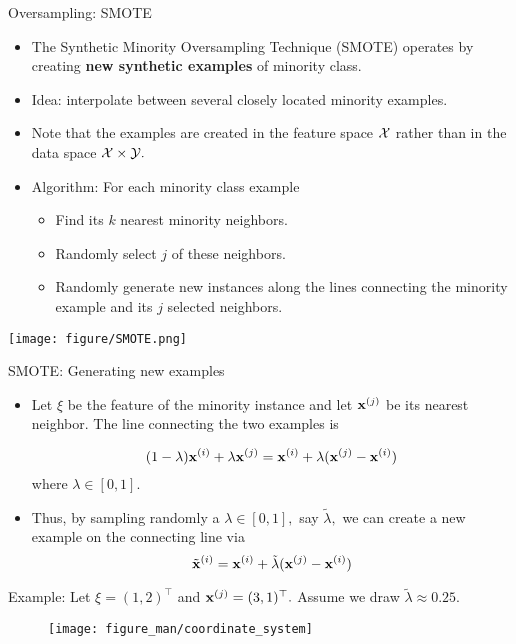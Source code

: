 \documentclass[11pt,compress,t,notes=noshow, xcolor=table]{beamer}
\begin{document}
	
	\begin{frame}{Oversampling: SMOTE}
		\footnotesize
		\begin{itemize}
			\item The Synthetic Minority Oversampling Technique (SMOTE) operates by creating \textbf{new synthetic examples} of minority class.

			\item Idea: interpolate between several closely located minority examples.

			\item Note that the examples are created in the feature space $\mathcal{X}$ rather than in the data space $\mathcal{X}\times\mathcal{Y}.$
	
			\item Algorithm: For each minority class example 

			\begin{itemize} 
                \footnotesize

				\item Find its $k$ nearest minority neighbors.
		
				\item Randomly select $j$ of these neighbors.
		
				\item Randomly generate new instances along the lines connecting the minority example and its $j$ selected neighbors.
		
			\end{itemize}

		\end{itemize}
%	
		\texttt{[image: figure/SMOTE.png]} 
	\end{frame}
	
	\begin{frame}{SMOTE: Generating new examples}
		\footnotesize
		
			\begin{itemize}
	
				\item Let $\xi$ be the feature of the minority instance and let $\mathbf{x}^{(j)}$ be its nearest neighbor. The line connecting the two examples is
				
				$$		(1-\lambda) \mathbf{x}^{(i)} + \lambda\mathbf{x}^{(j)} = \mathbf{x}^{(i)} + \lambda(\mathbf{x}^{(j)} - \mathbf{x}^{(i)})	$$
%				
				where $\lambda \in [0,1].$
				\item Thus, by sampling randomly a $\lambda \in [0,1],$ say $\tilde{\lambda},$ we can create a new example on the connecting line via
%				
				$$   \tilde{\mathbf{x}}^{(i)} =  \mathbf{x}^{(i)} + \tilde{\lambda}(\mathbf{x}^{(j)} - \mathbf{x}^{(i)})	 $$
			\end{itemize}		
				
				Example: Let $\xi = (1,2)^\top$ and $\mathbf{x}^{(j)} = (3,1)^\top.$ Assume we draw $\tilde{\lambda} \approx 0.25.$
			\begin{figure}
				\centering
				\texttt{[image: figure\_man/coordinate\_system]}
			\end{figure}
		
	\end{frame}
\end{document}
